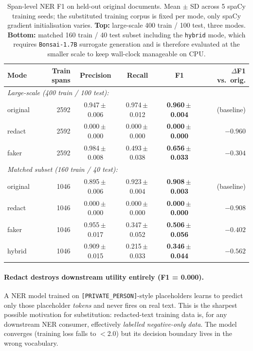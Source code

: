 \documentclass[11pt]{article}
\newcommand{\code}[1]{\texttt{#1}}
\newcommand{\bonsai}{\code{Bonsai-1.7B}}
\begin{document}
\begin{table}[t]
\centering
\caption{Span-level NER F1 on held-out original documents. Mean
$\pm$ SD across 5 spaCy training seeds; the substituted training
corpus is fixed per mode, only spaCy gradient initialisation varies.
\textbf{Top:} large-scale 400 train / 100 test, three modes.
\textbf{Bottom:} matched 160 train / 40 test subset including the
\code{hybrid} mode, which requires \bonsai{} surrogate generation
and is therefore evaluated at the smaller scale to keep wall-clock
manageable on CPU.}
\label{tab:ner}
\setlength{\tabcolsep}{4pt}
\begin{tabular}{l r c c c r}
\toprule
\textbf{Mode} & \textbf{Train spans} & \textbf{Precision} & \textbf{Recall}
& \textbf{F1} & \textbf{$\Delta$F1 vs.\ orig.} \\
\midrule
\multicolumn{6}{l}{\emph{Large-scale (400 train / 100 test):}} \\
original & 2592 & 0.947\,$\pm$\,0.006 & 0.974\,$\pm$\,0.012 & \textbf{0.960\,$\pm$\,0.004} & (baseline) \\
redact   & 2592 & 0.000\,$\pm$\,0.000 & 0.000\,$\pm$\,0.000 & \textbf{0.000\,$\pm$\,0.000} & $-0.960$    \\
faker    & 2592 & 0.984\,$\pm$\,0.008 & 0.493\,$\pm$\,0.038 & \textbf{0.656\,$\pm$\,0.033} & $-0.304$    \\
\midrule
\multicolumn{6}{l}{\emph{Matched subset (160 train / 40 test):}} \\
original & 1046 & 0.895\,$\pm$\,0.006 & 0.923\,$\pm$\,0.004 & \textbf{0.908\,$\pm$\,0.003} & (baseline) \\
redact   & 1046 & 0.000\,$\pm$\,0.000 & 0.000\,$\pm$\,0.000 & \textbf{0.000\,$\pm$\,0.000} & $-0.908$ \\
faker    & 1046 & 0.955\,$\pm$\,0.017 & 0.347\,$\pm$\,0.052 & \textbf{0.506\,$\pm$\,0.056} & $-0.402$ \\
hybrid   & 1046 & 0.909\,$\pm$\,0.015 & 0.215\,$\pm$\,0.033 & \textbf{0.346\,$\pm$\,0.044} & $-0.562$ \\
\bottomrule
\end{tabular}
\end{table}

\paragraph{Redact destroys downstream utility entirely (F1 = 0.000).}
A NER model trained on \code{[PRIVATE\_PERSON]}-style placeholders
learns to predict only those placeholder \emph{tokens} and never fires
on real text. This is the sharpest possible motivation for
substitution: redacted-text training data is, for any downstream NER
consumer, effectively \emph{labelled negative-only data}. The model
converges (training loss falls to $<$2.0) but its decision boundary
lives in the wrong vocabulary.
\end{document}
